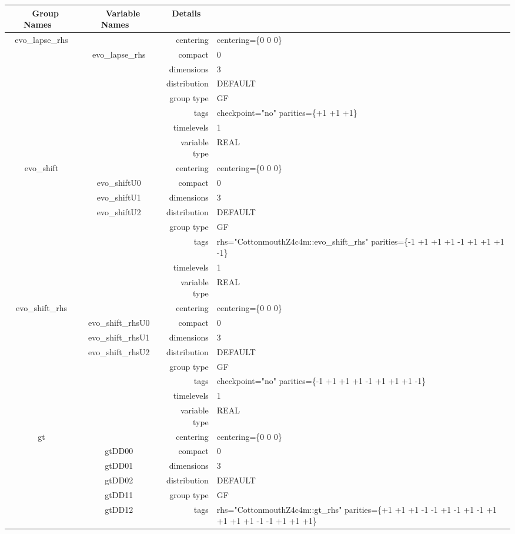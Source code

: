 \documentclass{article}
\begin{document}
\begin{tabular*}{150mm}{|c|c@{\extracolsep{\fill}}|rl|} \hline 
~ {\bf Group Names} ~ & ~ {\bf Variable Names} ~  &{\bf Details} ~ & ~ \\ 
\hline 
evo\_lapse\_rhs &  & centering & centering=\{0 0 0\} \\ 
 & evo\_lapse\_rhs & compact & 0 \\ 
 &  & dimensions & 3 \\ 
 &  & distribution & DEFAULT \\ 
 &  & group type & GF \\ 
 &  & tags & checkpoint="no" parities=\{+1 +1 +1\} \\ 
 &  & timelevels & 1 \\ 
 &  & variable type & REAL \\ 
\hline 
evo\_shift &  & centering & centering=\{0 0 0\} \\ 
 & evo\_shiftU0 & compact & 0 \\ 
 & evo\_shiftU1 & dimensions & 3 \\ 
 & evo\_shiftU2 & distribution & DEFAULT \\ 
 &  & group type & GF \\ 
 &  & tags & rhs="CottonmouthZ4c4m::evo\_shift\_rhs" parities=\{-1 +1 +1  +1 -1 +1  +1 +1 -1\} \\ 
 &  & timelevels & 1 \\ 
 &  & variable type & REAL \\ 
\hline 
evo\_shift\_rhs &  & centering & centering=\{0 0 0\} \\ 
 & evo\_shift\_rhsU0 & compact & 0 \\ 
 & evo\_shift\_rhsU1 & dimensions & 3 \\ 
 & evo\_shift\_rhsU2 & distribution & DEFAULT \\ 
 &  & group type & GF \\ 
 &  & tags & checkpoint="no" parities=\{-1 +1 +1  +1 -1 +1  +1 +1 -1\} \\ 
 &  & timelevels & 1 \\ 
 &  & variable type & REAL \\ 
\hline 
gt &  & centering & centering=\{0 0 0\} \\ 
 & gtDD00 & compact & 0 \\ 
 & gtDD01 & dimensions & 3 \\ 
 & gtDD02 & distribution & DEFAULT \\ 
 & gtDD11 & group type & GF \\ 
 & gtDD12 & tags & rhs="CottonmouthZ4c4m::gt\_rhs" parities=\{+1 +1 +1  -1 -1 +1  -1 +1 -1  +1 +1 +1  +1 -1 -1  +1 +1 +1\} \\ 

\end{tabular*}
\end{document}
